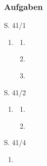
\subsubsection{Aufgaben}

\begin{Exercise}{S. 41/1}{}
\begin{enumerate}[leftmargin=*]
    \item [1.]\begin{enumerate}[label=\alph*),leftmargin=*]
        \item [a)] {
            }
        \item [b)] {
            }
        \item [c)] {
            }
    \end{enumerate}
\end{enumerate}
\end{Exercise}

\begin{Exercise}{S. 41/2}{}
\begin{enumerate}[leftmargin=*]
    \item [2.]\begin{enumerate}[label=\alph*),leftmargin=*]
        \item [a)] {
            }
        \item [b)] {
            }
    \end{enumerate}
\end{enumerate}
\end{Exercise}

\begin{Exercise}{S. 41/4}{}
\begin{enumerate}[leftmargin=*]
    \item [4.]
\end{enumerate}
\end{Exercise}

